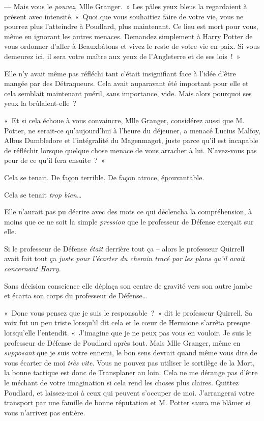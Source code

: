 --- Mais vous le \emph{pouvez}, Mlle Granger.~» Les pâles yeux bleus la regardaient à présent avec intensité. «~Quoi que vous souhaitiez faire de votre vie, vous ne pourrez plus l'atteindre à Poudlard, plus maintenant. Ce lieu est mort pour vous, même en ignorant les autres menaces. Demandez simplement à Harry Potter de vous ordonner d'aller à Beauxbâtons et vivez le reste de votre vie en paix. Si vous demeurez ici, il sera votre maître aux yeux de l'Angleterre et de ses lois~!~»

Elle n'y avait même pas réfléchi tant c'était insignifiant face à l'idée d'être mangée par des Détraqueurs. Cela avait auparavant été important pour elle et cela semblait maintenant puéril, sans importance, vide. Mais alors pourquoi ses yeux la brûlaient-elle~?

«~Et si cela échoue à vous convaincre, Mlle Granger, considérez aussi que M. Potter, ne serait-ce qu'aujourd'hui à l'heure du déjeuner, a menacé Lucius Malfoy, Albus Dumbledore et l'intégralité du Magenmagot, juste parce qu'il est incapable de réfléchir lorsque quelque chose menace de vous arracher à lui. N'avez-vous pas peur de ce qu'il fera ensuite~?~»

Cela se tenait. De façon terrible. De façon atroce, épouvantable.

Cela se tenait \emph{trop bien}…

Elle n'aurait pas pu décrire avec des mots ce qui déclencha la compréhension, à moins que ce ne soit la simple \emph{pression} que le professeur de Défense exerçait sur elle.

Si le professeur de Défense \emph{était} derrière tout ça -- alors le professeur Quirrell avait fait tout ça \emph{juste pour l'écarter du chemin tracé par les plans qu'il avait concernant Harry.}

Sans décision conscience elle déplaça son centre de gravité vers son autre jambe et écarta son corps du professeur de Défense…

«~Donc vous pensez que je suis le responsable~?~» dit le professeur Quirrell. Sa voix fut un peu triste lorsqu'il dit cela et le cœur de Hermione s'arrêta presque lorsqu'elle l'entendit. «~J'imagine que je ne peux pas vous en vouloir. Je suis le professeur de Défense de Poudlard après tout. Mais Mlle Granger, même en \emph{supposant} que je suis votre ennemi, le bon sens devrait quand même vous dire de vous écarter de moi \emph{très vite}. Vous ne pouvez pas utiliser le sortilège de la Mort, la bonne tactique est donc de Transplaner au loin. Cela ne me dérange pas d'être le méchant de votre imagination si cela rend les choses plus claires. Quittez Poudlard, et laissez-moi à ceux qui peuvent s'occuper de moi. J'arrangerai votre transport par une famille de bonne réputation et M. Potter saura me blâmer si vous n'arrivez pas entière.

